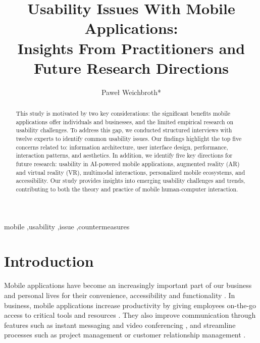 \documentclass[preprint,12pt,number]{elsarticle}
\begin{document}
\begin{frontmatter}

\title{Usability Issues With Mobile Applications: \\ Insights From Practitioners and Future Research Directions}

\author[inst1]{Paweł Weichbroth*}

\begin{abstract}
This study is motivated by two key considerations: the significant benefits mobile applications offer individuals and businesses, and the limited empirical research on usability challenges. To address this gap, we conducted structured interviews with twelve experts to identify common usability issues. Our findings highlight the top five concerns related to: information architecture, user interface design, performance, interaction patterns, and aesthetics. In addition, we identify five key directions for future research: usability in AI-powered mobile applications, augmented reality (AR) and virtual reality (VR), multimodal interactions, personalized mobile ecosystems, and accessibility. Our study provides insights into emerging usability challenges and trends, contributing to both the theory and practice of mobile human-computer interaction.
\end{abstract}

\begin{keyword}
mobile \sep usability \sep issue \sep countermeasures
\end{keyword}

\end{frontmatter}

\section{Introduction}
\label{introduction}
Mobile applications have become an increasingly important part of our business and personal lives for their convenience, accessibility and functionality \citep{islam2010mobile}. 
In business, mobile applications increase productivity by giving employees on-the-go access to critical tools and resources \citep{Wagner2023}. They also improve communication through features such as instant messaging \citep{afzal2021encrypted} and video conferencing \citep{lee2022intelligent}, and streamline processes such as project management \citep{Bali2023} or customer relationship management \citep{ahmed2014event}. 
\end{document}
